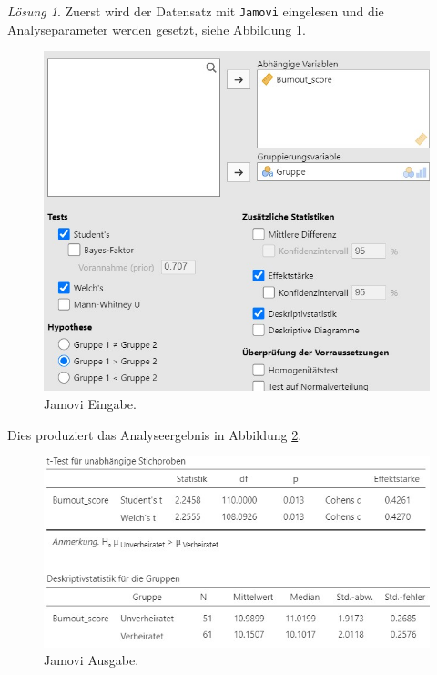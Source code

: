 \documentclass[
]{book}
\theoremstyle{definition}
\theoremstyle{definition}
\theoremstyle{definition}
\theoremstyle{definition}
\theoremstyle{remark}
\newtheorem*{solution}{Lösung}
\begin{document}
\begin{solution}

Zuerst wird der Datensatz mit \texttt{Jamovi} eingelesen und die Analyseparameter werden gesetzt, siehe Abbildung \ref{fig:sol-ehe-burnout-input}.

\begin{figure}
\includegraphics[width=1\linewidth]{figures/06-exr-ehe-burnout-jmv-input} \caption{Jamovi Eingabe.}\label{fig:sol-ehe-burnout-input}
\end{figure}

Dies produziert das Analyseergebnis in Abbildung \ref{fig:sol-ehe-burnout-output}.

\begin{figure}
\includegraphics[width=1\linewidth]{figures/06-exr-ehe-burnout-jmv-output} \caption{Jamovi Ausgabe.}\label{fig:sol-ehe-burnout-output}
\end{figure}


\end{solution}
\end{document}
